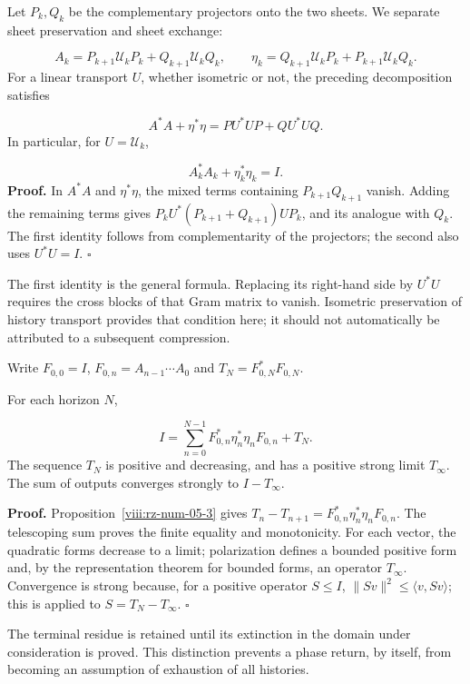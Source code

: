 Let \(P_k,Q_k\) be the complementary projectors onto the two sheets. We separate sheet preservation and sheet exchange:

\[
A_k=P_{k+1}\mathcal U_kP_k+Q_{k+1}\mathcal U_kQ_k,
\qquad
\eta_k=Q_{k+1}\mathcal U_kP_k+P_{k+1}\mathcal U_kQ_k.
\]
For a linear transport \(U\), whether isometric or not, the preceding decomposition satisfies

\[
A^*A+\eta^*\eta=PU^*UP+QU^*UQ.
\]
In particular, for \(U=\mathcal U_k\),

\[
A_k^*A_k+\eta_k^*\eta_k=I.
\]
\textbf{Proof.} In \(A^*A\) and \(\eta^*\eta\), the mixed terms containing \(P_{k+1}Q_{k+1}\) vanish. Adding the remaining terms gives \(P_kU^*(P_{k+1}+Q_{k+1})UP_k\), and its analogue with \(Q_k\). The first identity follows from complementarity of the projectors; the second also uses \(U^*U=I\). \hfill\(\square\)

The first identity is the general formula. Replacing its right-hand side by \(U^*U\) requires the cross blocks of that Gram matrix to vanish. Isometric preservation of history transport provides that condition here; it should not automatically be attributed to a subsequent compression.

Write \(F_{0,0}=I\), \(F_{0,n}=A_{n-1}\cdots A_0\) and \(T_N=F_{0,N}^*F_{0,N}\).

For each horizon \(N\),

\[
I=\sum_{n=0}^{N-1}
F_{0,n}^*\eta_n^*\eta_nF_{0,n}+T_N.
\]
The sequence \(T_N\) is positive and decreasing, and has a positive strong limit \(T_\infty\). The sum of outputs converges strongly to \(I-T_\infty\).

\textbf{Proof.} Proposition~\ref{viii:rz-num-05-3} gives \(T_n-T_{n+1}=F_{0,n}^*\eta_n^*\eta_nF_{0,n}\). The telescoping sum proves the finite equality and monotonicity. For each vector, the quadratic forms decrease to a limit; polarization defines a bounded positive form and, by the representation theorem for bounded forms, an operator \(T_\infty\). Convergence is strong because, for a positive operator \(S\leq I\), \(\|Sv\|^2\leq\langle v,Sv\rangle\); this is applied to \(S=T_N-T_\infty\). \hfill\(\square\)

The terminal residue is retained until its extinction in the domain under consideration is proved. This distinction prevents a phase return, by itself, from becoming an assumption of exhaustion of all histories.

